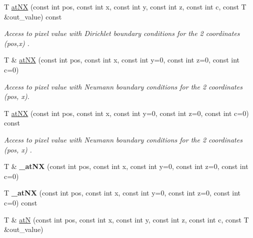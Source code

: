 \begin{DoxyCompactItemize}
\mbox{\label{structcimg__library__suffixed_1_1CImgList_a0e96d35da5389885c3d5d1fdd193d6a1}} 
T \hyperlink{structcimg__library__suffixed_1_1CImgList_a0e96d35da5389885c3d5d1fdd193d6a1}{at\+NX} (const int pos, const int x, const int y, const int z, const int c, const T \&out\+\_\+value) const
\begin{DoxyCompactList}\small\item\em Access to pixel value with Dirichlet boundary conditions for the 2 coordinates ({\ttfamily pos},{\ttfamily x}) . \end{DoxyCompactList}\item 
T \& \hyperlink{structcimg__library__suffixed_1_1CImgList_a25737d59c0260e56d645750fcecc3a4b}{at\+NX} (const int pos, const int x, const int y=0, const int z=0, const int c=0)
\begin{DoxyCompactList}\small\item\em Access to pixel value with Neumann boundary conditions for the 2 coordinates ({\ttfamily pos}, {\ttfamily x}). \end{DoxyCompactList}\item 
\mbox{\label{structcimg__library__suffixed_1_1CImgList_a04d9a5bac105d36f5624be2dafc8b36e}} 
T \hyperlink{structcimg__library__suffixed_1_1CImgList_a04d9a5bac105d36f5624be2dafc8b36e}{at\+NX} (const int pos, const int x, const int y=0, const int z=0, const int c=0) const
\begin{DoxyCompactList}\small\item\em Access to pixel value with Neumann boundary conditions for the 2 coordinates ({\ttfamily pos}, {\ttfamily x}) . \end{DoxyCompactList}\item 
\mbox{\label{structcimg__library__suffixed_1_1CImgList_a1a1ce6c98540e9071d1a86eae1920d7b}} 
T \& {\bfseries \+\_\+at\+NX} (const int pos, const int x, const int y=0, const int z=0, const int c=0)
\item 
\mbox{\label{structcimg__library__suffixed_1_1CImgList_a548a4900f79513f6e327e8d4694a0120}} 
T {\bfseries \+\_\+at\+NX} (const int pos, const int x, const int y=0, const int z=0, const int c=0) const
\item 
T \& \hyperlink{structcimg__library__suffixed_1_1CImgList_a37f83bbfefb04d6f83c39185a45b776e}{atN} (const int pos, const int x, const int y, const int z, const int c, const T \&out\+\_\+value)

\end{DoxyCompactItemize}

